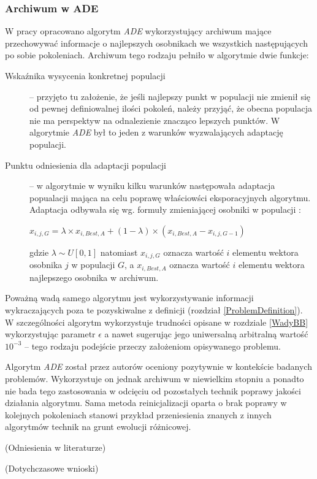\documentclass[12pt,a4paper]{report}
\begin{document}
{{{\subsubsection{Archiwum w ADE}
\par{
W pracy \cite{ArchivedDE} opracowano algorytm \emph{ADE} wykorzystujący archiwum mające przechowywać informacje o najlepszych osobnikach we wszystkich następujących po sobie pokoleniach. Archiwum tego rodzaju pełniło w algorytmie dwie funkcje:
\begin{description}
\item[Wskaźnika wysycenia konkretnej populacji] -- przyjęto tu założenie, że jeśli najlepszy punkt w populacji nie zmienił się od pewnej definiowalnej ilości pokoleń, należy przyjąć, że obecna populacja nie ma perspektyw na odnalezienie znacząco lepszych punktów. W algorytmie \emph{ADE} był to jeden z warunków wyzwalających adaptację populacji.
\item[Punktu odniesienia dla adaptacji populacji] -- w algorytmie w wyniku kilku warunków następowała adaptacja popualacji mająca na celu poprawę właściowści eksporacyjnych algorytmu. Adaptacja odbywała się wg. formuły zmieniającej osobniki w populacji \cite{ArchivedDE}:
\begin{center}
$x_{i,j,G} = \lambda \times x_{i,Best,A} + (1 - \lambda) \times (x_{i,Best,A} - x_{i,j,G-1})$
\end{center}
gdzie $\lambda \sim U[0,1]$ natomiast $x_{i,j,G}$ oznacza wartość $i$ elementu wektora osobnika $j$ w populacji $G$, a $x_{i,Best,A}$ oznacza wartość $i$ elementu wektora najlepszego osobnika w archiwum.
\end{description}
}
\par{
Poważną wadą samego algorytmu jest wykorzystywanie informacji wykraczających poza te pozyskiwalne z definicji (rozdział \ref{ProblemDefinition}). W szczególności algorytm wykorzystuje trudności opisane w rozdziale \ref{WadyBB} wykorzystując parametr $\epsilon$ a nawet sugerując jego uniwersalną arbitralną wartość $10^{-3}$ -- tego rodzaju podejście przeczy założeniom opisywanego problemu.
}
\par{
Algorytm \emph{ADE} został przez autorów oceniony pozytywnie w kontekście badanych problemów. Wykorzystuje on jednak archiwum w niewielkim stopniu a ponadto nie bada tego zastosowania w odcięciu od pozostałych technik poprawy jakości działania algorytmu. Sama metoda reinicjalizacji oparta o brak poprawy w kolejnych pokoleniach stanowi przykład przeniesienia znanych z innych algorytmów technik na grunt ewolucji różnicowej.
}
\par{
(Odniesienia w literaturze)
\cite{JADE,SHADE,ClusterArchiveDE,RobustArchiveDE,ArchivedDE}
}
\par{(Dotychczasowe wnioski)}

}}}
\end{document}
